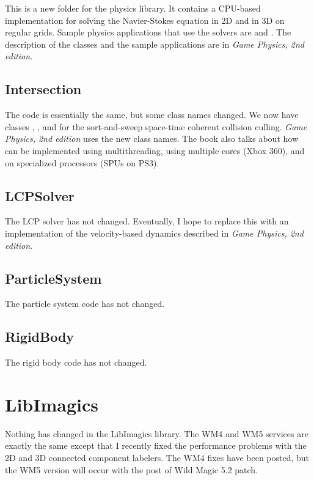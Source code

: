 \documentclass{article}
\begin{document}
This is a new folder for the physics library.  It contains a CPU-based
implementation for solving the Navier-Stokes equation in 2D and in 3D
on regular grids.  Sample physics applications that use the solvers
are  and .  The description of the classes
and the sample applications are in {\em Game Physics, 2nd edition}.

\subsection{Intersection}

The code is essentially the same, but some class names changed.  We now
have classes , , and 
for the sort-and-sweep space-time coherent collision culling.  {\em Game
Physics, 2nd edition} uses the new class names.  The book also talks
about how  can be implemented using multithreading,
using multiple cores (Xbox 360), and on specialized processors (SPUs on
PS3).

\subsection{LCPSolver}

The LCP solver has not changed.  Eventually, I hope to replace this with
an implementation of the velocity-based dynamics described in {\em Game
Physics, 2nd edition}.

\subsection{ParticleSystem}

The particle system code has not changed.

\subsection{RigidBody}

The rigid body code has not changed.

\section{LibImagics}

Nothing has changed in the LibImagics library.  The WM4 and WM5 services are
exactly the same except that I recently fixed the performance problems with
the 2D and 3D connected component labelers.  The WM4 fixes have been posted,
but the WM5 version will occur with the post of Wild Magic 5.2 patch.
\end{document}
